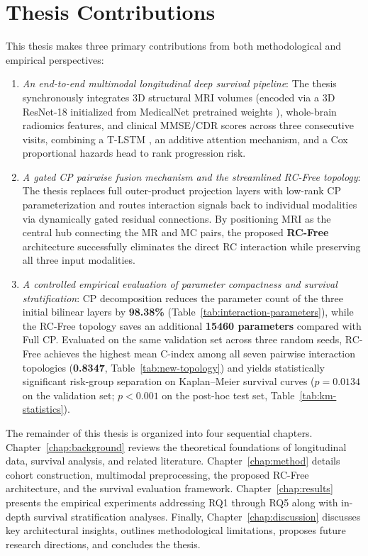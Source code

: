 \section{Thesis Contributions}
This thesis makes three primary contributions from both methodological and empirical perspectives:
\begin{enumerate}
\item \emph{An end-to-end multimodal longitudinal deep survival pipeline}: The thesis synchronously integrates 3D structural MRI volumes (encoded via a 3D ResNet-18 initialized from MedicalNet pretrained weights \cite{chen2019med3d}), whole-brain radiomics features, and clinical MMSE/CDR scores across three consecutive visits, combining a T-LSTM \cite{baytas2017patient}, an additive attention mechanism, and a Cox proportional hazards head to rank progression risk.
\item \emph{A gated CP pairwise fusion mechanism and the streamlined RC-Free topology}: The thesis replaces full outer-product projection layers with low-rank CP parameterization and routes interaction signals back to individual modalities via dynamically gated residual connections. By positioning MRI as the central hub connecting the MR and MC pairs, the proposed \textbf{RC-Free} architecture successfully eliminates the direct RC interaction while preserving all three input modalities.
\item \emph{A controlled empirical evaluation of parameter compactness and survival stratification}: CP decomposition reduces the parameter count of the three initial bilinear layers by \textbf{98.38\%} (Table~\ref{tab:interaction-parameters}), while the RC-Free topology saves an additional \textbf{15460 parameters} compared with Full CP. Evaluated on the same validation set across three random seeds, RC-Free achieves the highest mean C-index among all seven pairwise interaction topologies (\textbf{0.8347}, Table~\ref{tab:new-topology}) and yields statistically significant risk-group separation on Kaplan--Meier survival curves ($p=0.0134$ on the validation set; $p<0.001$ on the post-hoc test set, Table~\ref{tab:km-statistics}).
\end{enumerate}

The remainder of this thesis is organized into four sequential chapters. Chapter~\ref{chap:background} reviews the theoretical foundations of longitudinal data, survival analysis, and related literature. Chapter~\ref{chap:method} details cohort construction, multimodal preprocessing, the proposed RC-Free architecture, and the survival evaluation framework. Chapter~\ref{chap:results} presents the empirical experiments addressing RQ1 through RQ5 along with in-depth survival stratification analyses. Finally, Chapter~\ref{chap:discussion} discusses key architectural insights, outlines methodological limitations, proposes future research directions, and concludes the thesis.
